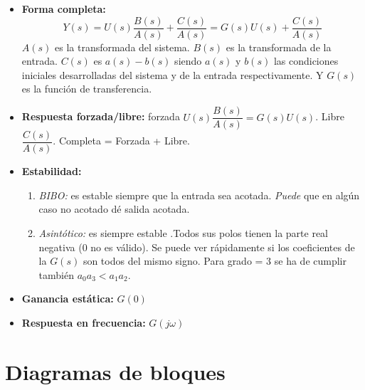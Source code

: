 \documentclass[a4paper, twocolumn, 10pt]{article}
\begin{document}
\begin{itemize}
	\item \textbf{Forma completa:} \[Y(s) = U(s)\frac{B(s)}{A(s)} + \frac{C(s)}{A(s)} = G(s)U(s) + \frac{C(s)}{A(s)}\] $A(s)$ es la transformada del sistema. $B(s)$ es la transformada de la entrada. $C(s)$ es $a(s) - b(s)$ siendo $a(s)$ y $b(s)$ las condiciones iniciales desarrolladas del sistema y de la entrada respectivamente. Y $G(s)$ es la función de transferencia.
	\item \textbf{Respuesta forzada/libre:} forzada $U(s)\dfrac{B(s)}{A(s)} = G(s)U(s)$. Libre $\dfrac{C(s)}{A(s)}$. Completa = Forzada + Libre.
	\item \textbf{Estabilidad:}
	\begin{enumerate}
		\item \textit{BIBO:} es estable siempre que la entrada sea acotada. \textit{Puede} que en algún caso no acotado dé salida acotada.
		\item \textit{Asintótico:} es siempre estable .Todos sus polos tienen la parte real negativa (0 no es válido). Se puede ver rápidamente si los coeficientes de la $G(s)$ son todos del mismo signo. Para grado = 3 se ha de cumplir también $a_0a_3<a_1a_2$.
	\end{enumerate}
	\item \textbf{Ganancia estática:} $G(0)$
	\item \textbf{Respuesta en frecuencia:} $G(j\omega)$
\end{itemize}

\section{Diagramas de bloques}
\end{document}
